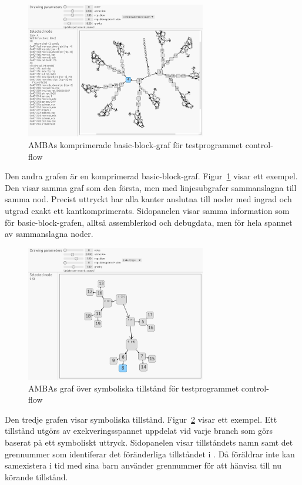 \begin{figure}
    \centering
    \includegraphics[width=0.7\textwidth]{figures/graph_block_compressed.png}
    \caption{
        AMBAs komprimerade basic-block-graf för testprogrammet control-flow
    }\label{fig:graf-compressed}
\end{figure}

Den andra grafen är en komprimerad basic-block-graf.
Figur~\ref{fig:graf-compressed} visar ett exempel. Den visar samma graf som den
första, men med linjesubgrafer sammanslagna till samma nod. Precist uttryckt har
alla kanter anslutna till noder med ingrad och utgrad exakt ett
kantkomprimerats. Sidopanelen visar samma information som för
basic-block-grafen, alltså assemblerkod och debugdata, men för hela spannet av
sammanslagna noder.

\begin{figure}
    \centering
    \includegraphics[width=0.7\textwidth]{figures/graph_symbolic.png}
    \caption{
        AMBAs graf över symboliska tillstånd för testprogrammet control-flow
    }\label{fig:graf-symbolic}
\end{figure}

Den tredje grafen visar symboliska tillstånd. Figur~\ref{fig:graf-symbolic}
visar ett exempel. Ett tillstånd utgörs av exekveringsspannet uppdelat vid varje
branch som görs baserat på ett symboliskt uttryck. Sidopanelen visar
tillståndets namn samt det grennummer som identiferar det föränderliga
tillståndet i \stoe{}. Då föräldrar inte kan samexistera i tid med sina barn
använder \stoe{} grennummer för att hänvisa till nu körande tillstånd.

